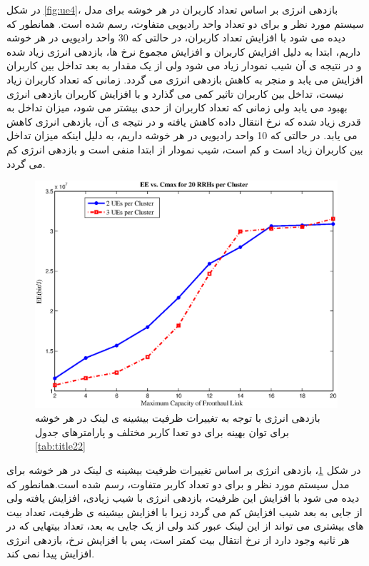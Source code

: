 در شکل \ref{fig:ue4}، بازدهی انرژی بر اساس تعداد کاربران در هر خوشه برای مدل سیستم مورد نظر و برای دو تعداد واحد رادیویی متفاوت، رسم شده است. همانطور که  دیده می شود با افزایش تعداد کاربران، در حالتی که 30 واحد رادیویی در هر خوشه داریم، ابتدا به دلیل افزایش کاربران و افزایش مجموع نرخ ها، بازدهی انرژی زیاد شده و در نتیجه ی آن شیب نمودار زیاد می شود ولی از یک مقدار به بعد تداخل بین کاربران افزایش می یابد و منجر به کاهش بازدهی انرژی می گردد. زمانی که تعداد کاربران زیاد نیست، تداخل بین کاربران تاثیر کمی می گذارد و با افزایش کاربران بازدهی انرژی بهبود می یابد ولی زمانی که تعداد کاربران از حدی بیشتر می شود، میزان تداخل به قدری زیاد شده که نرخ انتقال داده کاهش یافته و در نتیجه ی آن، بازدهی انرژی کاهش می یابد. 
در حالتی که  10 واحد رادیویی در هر خوشه داریم، به دلیل اینکه میزان تداخل بین کاربران زیاد است و  کم است، شیب نمودار از ابتدا منفی است و بازدهی انرژی کم می گردد.
 \begin{figure}[H]
  \centering
    \includegraphics[width=\linewidth]{./fig3/c4}
  \caption{  
  بازدهی انرژی با توجه به تغییرات ظرفیت
   بیشینه ی لینک 
   در هر خوشه برای توان بهینه برای 
   دو تعدا کاربر مختلف
   و پارامترهای جدول
    \ref{tab:title22} }
  \label{fig:c4}
\end{figure}
در شکل \ref{fig:c4}، بازدهی انرژی بر اساس تغییرات ظرفیت
   بیشینه ی لینک  در هر خوشه برای مدل سیستم مورد نظر و برای دو تعداد کاربر متفاوت، رسم شده است.همانطور که  دیده می شود با افزایش این ظرفیت، بازدهی انرژی با شیب زیادی، افزایش یافته ولی از جایی به بعد شیب افزایش کم می گردد زیرا با افزایش بیشینه ی ظرفیت، تعداد بیت های بیشتری می تواند از این لینک عبور کند ولی از یک جایی به بعد، تعداد بیتهایی که در هر ثانیه وجود دارد از نرخ انتقال بیت کمتر است، پس با افزایش نرخ، بازدهی انرژی افزایش پیدا نمی کند. 
